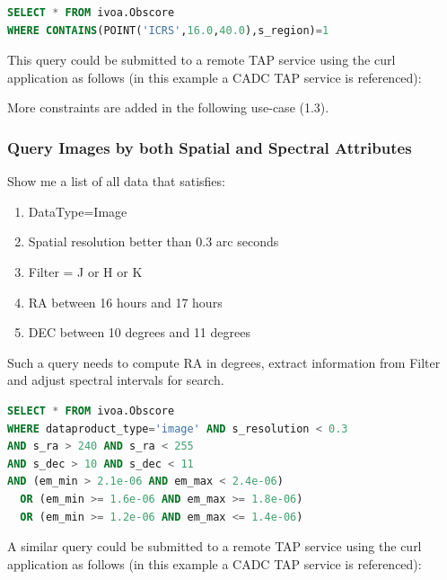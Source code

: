 \documentclass[11pt,a4paper]{ivoa}
\begin{document}
\begin{lstlisting}[language=SQL,flexiblecolumns=true]
SELECT * FROM ivoa.Obscore 
WHERE CONTAINS(POINT('ICRS',16.0,40.0),s_region)=1
\end{lstlisting}

This query could be submitted to a remote TAP service using the curl application as follows (in this example a CADC TAP
service is referenced):


More constraints are added in the following use-case (1.3).

\subsubsection*{Query Images by both Spatial and Spectral Attributes}
Show me a list of all data that satisfies:

\begin{enumerate}
\item DataType=Image
\item Spatial resolution better than 0.3 arc seconds
\item Filter = J or H or K
\item RA between 16 hours and 17 hours
\item DEC between 10 degrees and 11 degrees
\end{enumerate}
Such a query needs to compute RA in degrees, extract information from Filter and adjust spectral intervals for search.

\begin{lstlisting}[language=SQL,flexiblecolumns=true]
SELECT * FROM ivoa.Obscore 
WHERE dataproduct_type='image' AND s_resolution < 0.3 
AND s_ra > 240 AND s_ra < 255 
AND s_dec > 10 AND s_dec < 11 
AND (em_min > 2.1e-06 AND em_max < 2.4e-06) 
  OR (em_min >= 1.6e-06 AND em_max >= 1.8e-06) 
  OR (em_min >= 1.2e-06 AND em_max <= 1.4e-06)
\end{lstlisting}

A similar query could be submitted to a remote TAP service using the curl application as follows (in this example a CADC
TAP service is referenced):

\end{document}
